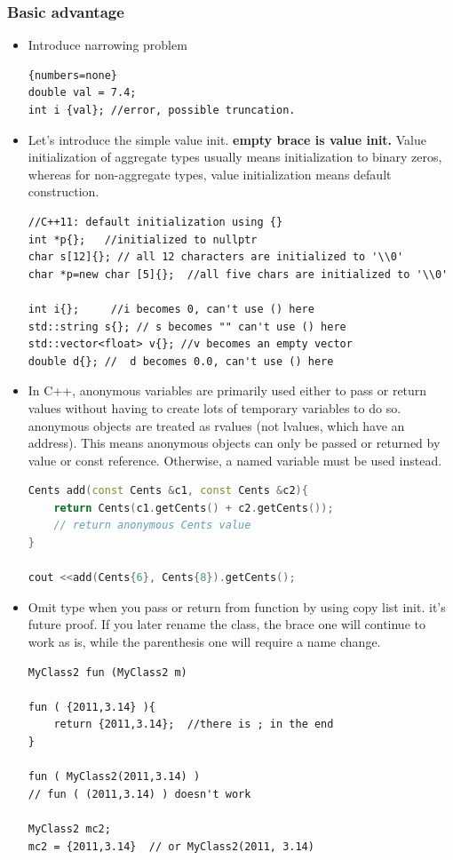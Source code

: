 \documentclass[a4paper,11pt,twoside]{book}
\begin{document}
\subsubsection{Basic advantage}
\begin{itemize}
\item Introduce narrowing problem
\begin{lstlisting}{numbers=none}
double val = 7.4;
int i {val}; //error, possible truncation.
\end{lstlisting}


\item Let's introduce the simple value init. \textbf{empty brace is value init.} Value initialization of aggregate types usually means initialization to binary zeros, whereas for non-aggregate types, value initialization means default construction.
\begin{lstlisting}[numbers = none]
//C++11: default initialization using {}
int *p{};   //initialized to nullptr
char s[12]{}; // all 12 characters are initialized to '\\0'
char *p=new char [5]{};  //all five chars are initialized to '\\0'

int i{};     //i becomes 0, can't use () here         
std::string s{}; // s becomes "" can't use () here  
std::vector<float> v{}; //v becomes an empty vector
double d{}; //  d becomes 0.0, can't use () here        
\end{lstlisting}




\item In C++, anonymous variables are primarily used either to pass or return values without having to create lots of temporary variables to do so. anonymous objects are treated as rvalues (not lvalues, which have an address). This means anonymous objects can only be passed or returned by value or const reference. Otherwise, a named variable must be used instead.

\begin{lstlisting}[frame=single, language=c++]
Cents add(const Cents &c1, const Cents &c2){
	return Cents(c1.getCents() + c2.getCents());
	// return anonymous Cents value
}

cout <<add(Cents{6}, Cents{8}).getCents();
\end{lstlisting}

\item Omit type when you pass or return from function by using copy list init. it's future proof. If you later rename the class, the brace one will continue to work as is, while the parenthesis one will require a name change.

\begin{lstlisting}
MyClass2 fun (MyClass2 m) 

fun ( {2011,3.14} ){
	return {2011,3.14};  //there is ; in the end
}

fun ( MyClass2(2011,3.14) ) 
// fun ( (2011,3.14) ) doesn't work

MyClass2 mc2;
mc2 = {2011,3.14}  // or MyClass2(2011, 3.14)
\end{lstlisting}


\end{itemize}
\end{document}
